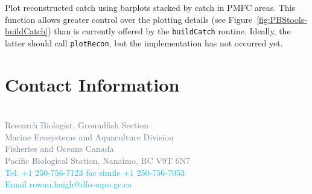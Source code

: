 \documentclass[letterpaper,12pt,fleqn]{article}
\def\tab{\hspace{0.5 in}}
\newcommand{\code}[1]{\small\texttt{#1}\normalsize}
\newcommand{\blue}[1]{{\textcolor{blue} {#1}}}
\newcommand{\grey}[1]{{\textcolor{slategrey} {#1}}}
\newcommand{\sky}[1]{{\textcolor{deepskyblue} {#1}}}
\begin{document}
\tab Plot reconstructed catch using barplots stacked by catch in PMFC areas. This function allows greater control over the plotting details (see Figure~\ref{fig:PBStools-buildCatch}) than is currently offered by the \code{buildCatch} routine. Ideally, the latter should call \code{plotRecon}, but the implementation has not occurred yet.



\vspace*{2ex}
{} %
\section* {Contact Information}
\vspace*{2ex} \noindent \blue{{\bf \normalsize Rowan Haigh}}\\
\small
\grey{Research Biologist, Groundfish Section\\
Marine Ecosystems and Aquaculture Division\\
Fisheries and Oceans Canada\\
Pacific Biological Station, Nanaimo, BC  V9T 6N7}\\
\sky{Tel. +1 250-756-7123  fac simile +1 250-756-7053\\
Email rowan.haigh@dfo-mpo.gc.ca} 
\normalsize

\clearpage


{}

\end{document}
